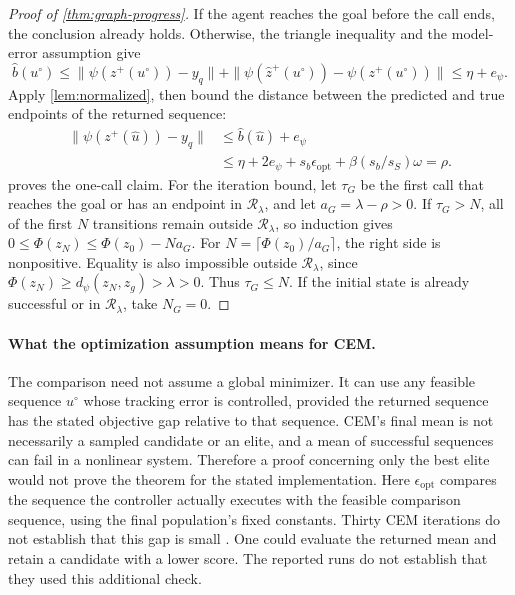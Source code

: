 \documentclass{article} %
\newcommand{\dd}{d_{\psi}}
\newcommand{\Rset}{\mathcal R_\lambda}
\theoremstyle{definition}
\theoremstyle{remark}
\begin{document}
\begin{proof}[Proof of \cref{thm:graph-progress}]
If the agent reaches the goal before the call ends, the conclusion already holds.
Otherwise,
the triangle inequality and the model-error assumption give
\[
 \widehat b(u^\circ)\le
 \|\psi(z^+(u^\circ))-y_q\|
 +\|\psi(\hat z^+(u^\circ))-\psi(z^+(u^\circ))\|
 \le\eta+e_\psi .
\]
Apply \cref{lem:normalized}, then bound the distance between the predicted and true
endpoints of the returned sequence:
\begin{align*}
 \|\psi(z^+(\hat u))-y_q\|
 &\le\widehat b(\hat u)+e_\psi\\
 &\le\eta+2e_\psi+s_b\epsilon_{\mathrm{opt}}
                +\beta(s_b/s_S)\omega=\rho.
\end{align*}
 proves the one-call claim.
For the iteration bound, let $\tau_G$ be the first call that reaches the goal or has
an endpoint in $\Rset$, and let
$a_G=\lambda-\rho>0$. If $\tau_G>N$,
all of the first $N$ transitions remain outside $\Rset$, so induction gives
$0\le\Phi(z_N)\le\Phi(z_0)-Na_G$.
For $N=\lceil\Phi(z_0)/a_G\rceil$, the right side is nonpositive.
Equality is also impossible outside $\Rset$, since
$\Phi(z_N)\ge\dd(z_N,z_g)>\lambda>0$.
Thus $\tau_G\le N$. If the initial state is already successful or in $\Rset$, take $N_G=0$.
\end{proof}

\paragraph{What the optimization assumption means for CEM.}
The comparison need not assume a global minimizer.
It can use any feasible sequence $u^\circ$ whose tracking error is controlled,
provided the returned sequence has the stated objective gap relative to that sequence.
CEM's final mean is not necessarily a sampled candidate or an elite, and a mean of
successful sequences can fail in a nonlinear system. Therefore a proof concerning only
the best elite would not prove the theorem for the stated implementation.
Here $\epsilon_{\mathrm{opt}}$ compares the sequence the controller actually executes
with the feasible comparison sequence, using the final population's fixed constants.
Thirty CEM iterations do not establish that this gap is small
\citep{cem}. One could evaluate the returned mean and retain a candidate with a lower
score. The reported runs do not establish that they used this additional check.
\end{document}

